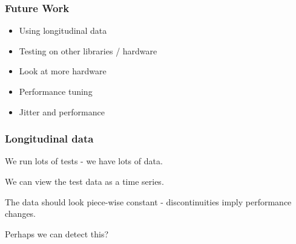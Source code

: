 \documentclass[10pt,aspectratio=169]{beamer}
\begin{document}

    
    


\begin{frame}
  \frametitle{Future Work}

  \begin{itemize}
  \item Using longitudinal data
    \medskip
  \item Testing on other libraries / hardware
    \medskip
  \item Look at more hardware
    \medskip
  \item Performance tuning
    \medskip
  \item Jitter and performance
  \end{itemize}
  
  
\end{frame}

\begin{frame}
  \frametitle{Longitudinal data}

  We run lots of tests - we have lots of data.

  \bigskip

  We can view the test data as a time series.

  \bigskip

  The data should look piece-wise constant - discontinuities imply
  performance changes.

  \bigskip

  Perhaps we can detect this?
  

\end{frame}
\end{document}
